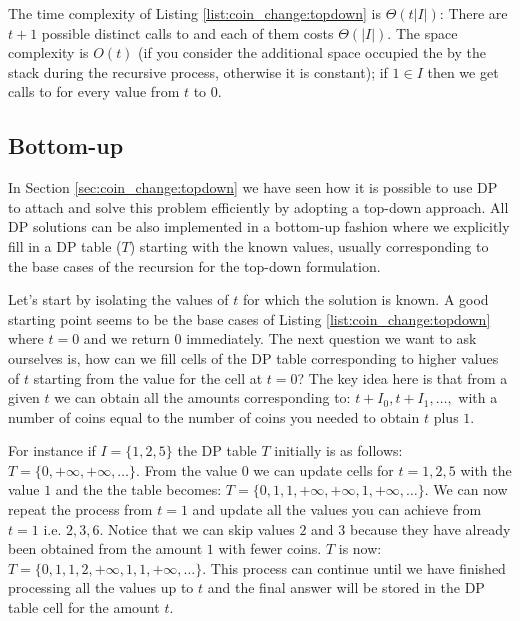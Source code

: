 

The time complexity of Listing \ref{list:coin_change:topdown} is $\Theta(t|I|)$: There are $t+1$ possible  distinct calls to  and each of them costs 
$\Theta(|I|)$. The space complexity is $O(t)$ (if you consider the additional space occupied the  by the stack during the recursive process, otherwise it is constant); if $1 \in I$ then we get calls to  for every value from $t$ to $0$.

\subsection{Bottom-up}
\label{coin_change:sec:bottomup}
In Section \ref{sec:coin_change:topdown} we have seen how it is possible to use DP to attach and solve this problem efficiently by adopting a top-down approach. All DP solutions can be also implemented in a bottom-up fashion where we explicitly fill in a DP table ($T$) starting with the known values, usually corresponding to the base cases of the recursion for the top-down formulation.

Let's start by isolating the values of $t$ for which the solution is known. 
A good starting point seems to be the base cases of Listing \ref{list:coin_change:topdown} where $t=0$ and we return $0$ immediately. The next question we want to ask ourselves is, how can we fill cells of the DP table corresponding to higher values of $t$ starting from the value for the cell at $t=0$? The key idea here is that from a given $t$ we can obtain all the amounts corresponding to: $t+I_0,t+I_1,\ldots,  $ with a number of coins equal to the number of coins you needed to obtain $t$ plus $1$.

For instance if $I=\{1,2,5\}$ the DP table $T$ initially is as follows: $T=\{0,+\infty,+\infty,\ldots\}$.
From the value $0$ we can update cells for $t=1,2,5$ with the value $1$ and the the table becomes: $T=\{0,1,1,+\infty,+\infty,1,+\infty,\ldots\}$.
We can now repeat the process from $t=1$ and update all the values you can achieve from $t=1$ i.e. $2,3,6$. 
Notice that we can skip values $2$ and $3$  because they have already been obtained from the amount $1$ with fewer coins. 
$T$ is now: $T=\{0,1,1,2,+\infty,1,1,+\infty,\ldots\}$.
This process can continue until we have finished processing all the values up to $t$ and the final answer will be stored in the DP table cell for the amount $t$. 


